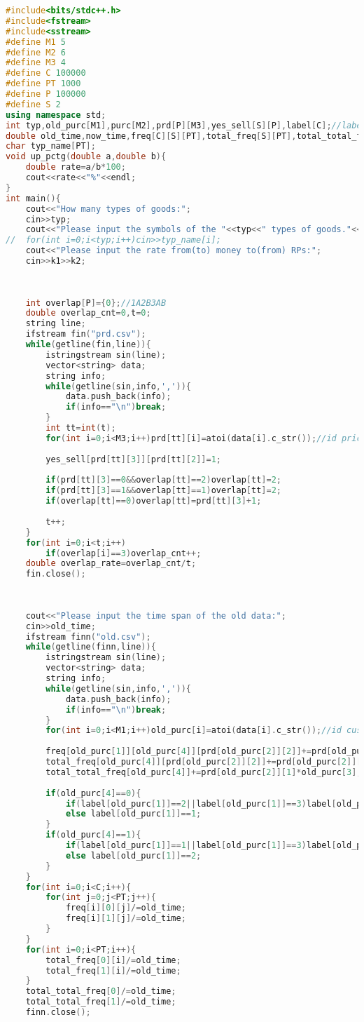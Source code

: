 \begin{lstlisting}[language=C++]
#include<bits/stdc++.h>
#include<fstream>
#include<sstream>
#define M1 5
#define M2 6
#define M3 4 
#define C 100000 
#define PT 1000
#define P 100000
#define S 2
using namespace std;
int typ,old_purc[M1],purc[M2],prd[P][M3],yes_sell[S][P],label[C];//label 1:OnlyA 2:OnlyB 3:A&B 
double old_time,now_time,freq[C][S][PT],total_freq[S][PT],total_total_freq[S],rp_used[S][PT],rp_loss[S][PT],total_rp_loss[S],k1,k2;
char typ_name[PT];
void up_pctg(double a,double b){
	double rate=a/b*100;
	cout<<rate<<"%"<<endl;
}
int main(){
	cout<<"How many types of goods:";
	cin>>typ;
	cout<<"Please input the symbols of the "<<typ<<" types of goods."<<endl;
//	for(int i=0;i<typ;i++)cin>>typ_name[i];
	cout<<"Please input the rate from(to) money to(from) RPs:";
	cin>>k1>>k2;
	
	
	
	int overlap[P]={0};//1A2B3AB
	double overlap_cnt=0,t=0;
	string line;
	ifstream fin("prd.csv");
	while(getline(fin,line)){
		istringstream sin(line);
		vector<string> data;
		string info;
		while(getline(sin,info,',')){
			data.push_back(info);
			if(info=="\n")break;
		}
		int tt=int(t);
		for(int i=0;i<M3;i++)prd[tt][i]=atoi(data[i].c_str());//id price typ_id shop(0A1B)
		
		yes_sell[prd[tt][3]][prd[tt][2]]=1;
		
		if(prd[tt][3]==0&&overlap[tt]==2)overlap[tt]=2;
		if(prd[tt][3]==1&&overlap[tt]==1)overlap[tt]=2;
		if(overlap[tt]==0)overlap[tt]=prd[tt][3]+1;
		
		t++;
	}
	for(int i=0;i<t;i++)
		if(overlap[i]==3)overlap_cnt++;
	double overlap_rate=overlap_cnt/t;
	fin.close();
	
	
	
	cout<<"Please input the time span of the old data:";
	cin>>old_time;
	ifstream finn("old.csv");
	while(getline(finn,line)){
		istringstream sin(line);
		vector<string> data;
		string info;
		while(getline(sin,info,',')){
			data.push_back(info);
			if(info=="\n")break;
		}
		for(int i=0;i<M1;i++)old_purc[i]=atoi(data[i].c_str());//id customer_id product_id amount shop(0A1B)
		
		freq[old_purc[1]][old_purc[4]][prd[old_purc[2]][2]]+=prd[old_purc[2]][1]*old_purc[3];//by customer&shop&product type
		total_freq[old_purc[4]][prd[old_purc[2]][2]]+=prd[old_purc[2]][1]*old_purc[3];
		total_total_freq[old_purc[4]]+=prd[old_purc[2]][1]*old_purc[3];
		
		if(old_purc[4]==0){
			if(label[old_purc[1]]==2||label[old_purc[1]]==3)label[old_purc[1]]==3;
			else label[old_purc[1]]==1;
		}
		if(old_purc[4]==1){
			if(label[old_purc[1]]==1||label[old_purc[1]]==3)label[old_purc[1]]==3;
			else label[old_purc[1]]==2;
		}
	}
	for(int i=0;i<C;i++){
		for(int j=0;j<PT;j++){
			freq[i][0][j]/=old_time;
			freq[i][1][j]/=old_time; 
		}
	}
	for(int i=0;i<PT;i++){
		total_freq[0][i]/=old_time;
		total_freq[1][i]/=old_time;
	}
	total_total_freq[0]/=old_time;
	total_total_freq[1]/=old_time;
	finn.close();
	

\end{lstlisting}
